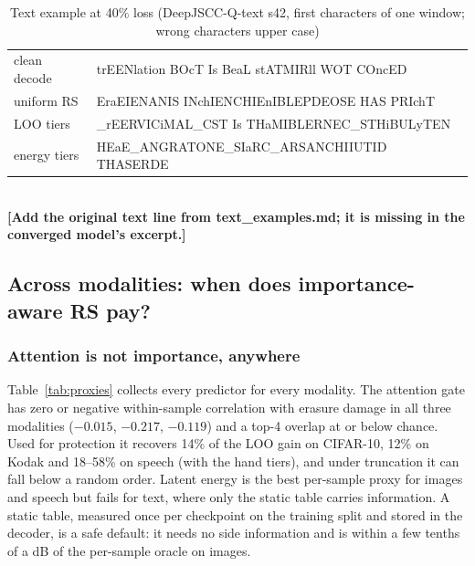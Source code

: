 \documentclass[journal]{IEEEtran}
\providecommand{\TBD}[1]{\textbf{\color{red}[#1]}}
\begin{document}
\begin{table}[t]\centering
\caption{Text example at 40\% loss (DeepJSCC-Q-text s42, first characters of one window; wrong characters
upper case)}\label{tab:text-examples}
\footnotesize\ttfamily
\begin{tabular}{p{}p{}}\toprule
\normalfont clean decode & trEENlation BOcT Is BeaL stATMIRll WOT COncED\\
\normalfont uniform RS & EraEIENANIS INchIENCHIEnIBLEPDEOSE HAS PRIchT\\
\normalfont LOO tiers & \_rEERVICiMAL\_CST Is THaMIBLERNEC\_STHiBULyTEN\\
\normalfont energy tiers & HEaE\_ANGRATONE\_SIaRC\_ARSANCHIIUTID THASERDE\\
\bottomrule\end{tabular}
\normalfont\\[2pt]\footnotesize\TBD{Add the original text line from text\_examples.md; it is missing in the converged model's excerpt.}
\end{table}

\subsection{Across modalities: when does importance-aware RS pay?}\label{sec:res-cross}

\subsubsection{Attention is not importance, anywhere}
Table~\ref{tab:proxies} collects every predictor for every modality. The attention gate has zero or
negative within-sample correlation with erasure damage in all three modalities ($-0.015$, $-0.217$,
$-0.119$) and a top-4 overlap at or below chance. Used for protection it recovers 14\% of the LOO gain on
CIFAR-10, 12\% on Kodak and 18--58\% on speech (with the hand tiers), and under truncation it can fall
below a random order. Latent energy is the best per-sample proxy for images and speech but fails for text,
where only the static table carries information. A static table, measured once per checkpoint on the
training split and stored in the decoder, is a safe default: it needs no side information and is within a
few tenths of a dB of the per-sample oracle on images.
\end{document}
